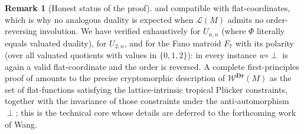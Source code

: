 \documentclass{article}
\theoremstyle{definition}
\newtheorem{remark}[theorem]{Remark}
\newcommand{\Dr}{\mathbf{Dr}}
\newcommand{\cLL}{\mathcal{L}}
\newcommand{\cW}{\mathcal{W}}
\begin{document}
\begin{remark}[Honest status of the proof]
and compatible with flat-coordinates, which is why no analogous duality is expected when $\cLL(M)$
admits no order-reversing involution. We have verified  exhaustively for $U_{n,n}$
(where $\Phi$ literally equals valuated duality), for $U_{2,n}$, and for the Fano matroid $F_7$ with
its polarity (over all valuated quotients with values in $\{0,1,2\}$): in every instance $w\circ
\perp$ is again a valid flat-coordinate and the order is reversed. A complete first-principles proof
of  amounts to the precise cryptomorphic description of $\cW^{\Dr}(M)$ as the set of
flat-functions satisfying the lattice-intrinsic tropical Pl\"ucker constraints, together with the
invariance of those constraints under the anti-automorphism $\perp$; this is the technical core whose
details are deferred to the forthcoming work of Wang.
\end{remark}
\end{document}
